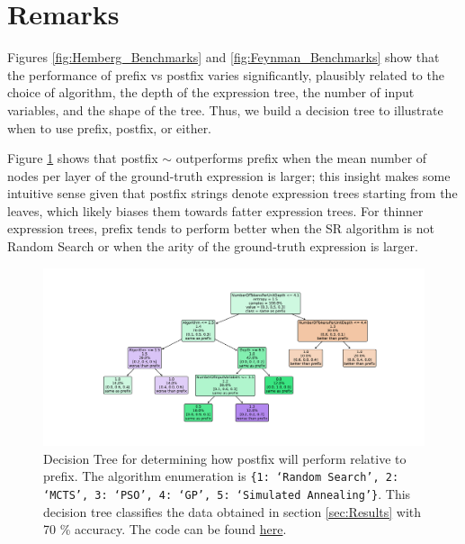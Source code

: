 \documentclass[runningheads]{llncs}
\begin{document}
\section{Remarks}
Figures \ref{fig:Hemberg_Benchmarks} and \ref{fig:Feynman_Benchmarks} show that the performance of prefix vs postfix varies significantly, plausibly related to the choice of algorithm, the depth of the expression tree, the number of input variables, and the shape of the tree. Thus, we build a decision tree to illustrate when to use prefix, postfix, or either. 
\par Figure \ref{fig:PrefixPostfixDecisionTree} shows that postfix $\sim$ outperforms prefix when the mean number of nodes per layer of the ground-truth expression is larger; this insight makes some intuitive sense given that postfix strings denote expression trees starting from the leaves, which likely biases them towards fatter expression trees. For thinner expression trees, prefix tends to perform better when the SR algorithm is not Random Search or when the arity of the ground-truth expression is larger. 

\begin{figure}
    \centering
    \includegraphics[width=\linewidth]{PrefixPostfixDecisionTree.pdf}
    \caption{Decision Tree for determining how postfix will perform relative to prefix. The algorithm enumeration is \texttt{\{1: `Random Search', 2: `MCTS', 3: `PSO', 4: `GP', 5: `Simulated Annealing'\}}. This decision tree classifies the data obtained in section \ref{sec:Results} with 70 \% accuracy. The code can be found \href{https://github.com/edfink234/Alpha-Zero-Symbolic-Regression/blob/0b5b6d0b56c2d108dda023a337edeb1084436da7/PrefixPostfixDecisionTree.py}{here}. } 
    \label{fig:PrefixPostfixDecisionTree}
\end{figure}
\end{document}
